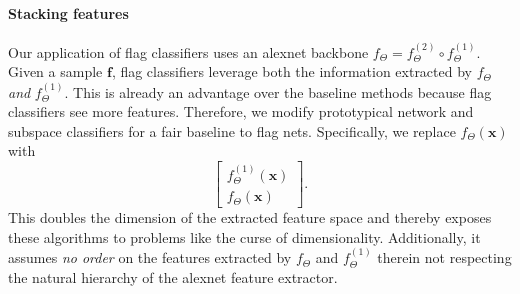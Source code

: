 \paragraph{Stacking features}
Our application of flag classifiers uses an alexnet backbone $f_\Theta = f^{(2)}_\Theta \circ f^{(1)}_\Theta$. Given a sample $\bm{f}$, flag classifiers leverage both the information extracted by $f_\Theta$ \emph{and} $f^{(1)}_\Theta$. This is already an advantage over the baseline methods because flag classifiers see more features. Therefore, we modify prototypical network and subspace classifiers for a fair baseline to flag nets. Specifically, we replace $f_\Theta(\bm{x})$ with 
\begin{equation}
    \begin{bmatrix}
        f^{(1)}_\Theta(\bm{x})\\
        f_\Theta(\bm{x})
    \end{bmatrix}.
\end{equation}
This doubles the dimension of the extracted feature space and thereby exposes these algorithms to problems like the curse of dimensionality. Additionally, it assumes \emph{no order} on the features extracted by $f_\Theta$ and $f^{(1)}_\Theta$ therein not respecting the natural hierarchy of the alexnet feature extractor.

